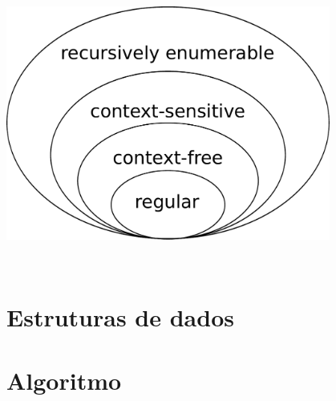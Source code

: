 \documentclass[conference]{IEEEtran}
\begin{document}

\begin{minipage}{\linewidth}
    \centering
    \label{chomsky}
    \includegraphics[width=0.8\textwidth]{Chomsky-hierarchy.pdf}
\end{minipage}
\\

\section{Estruturas de dados}



\section{Algoritmo}

\end{document}
